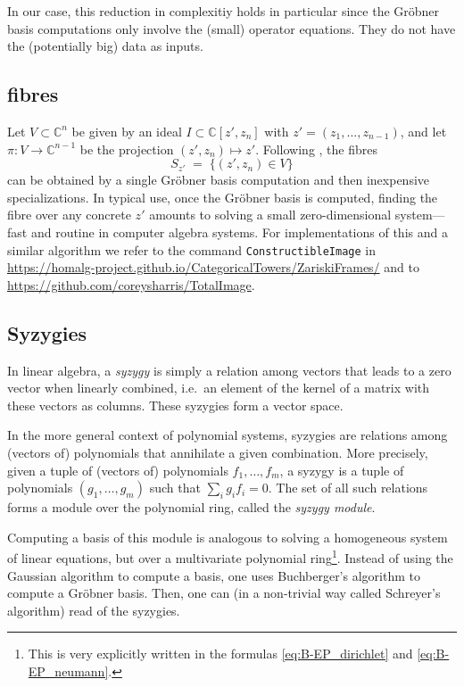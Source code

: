 \documentclass{article} %
\theoremstyle{plain}
\theoremstyle{definition}
\theoremstyle{remark}
\newcommand{\CC}{\mathbb{C}}
\begin{document}
In our case, this reduction in complexitiy holds in particular since the Gr\"obner basis computations only involve the (small) operator equations. They do not have  the (potentially big) data as inputs.

\subsection{fibres}


Let \(V \subset \CC^{n}\) be given by an ideal \(I \subset \CC[z',z_n]\) with \(z'=(z_1,\dots,z_{n-1})\), and let \(\pi:V\to\CC^{n-1}\) be the projection \((z',z_n)\mapsto z'\).
Following \citep{barakat2022algorithmic}, the fibres
\[
S_{z'} \;=\; \{(z',z_n)\in V\}
\]
can be obtained by a single Gröbner basis computation and then inexpensive specializations. In typical use, once the Gröbner basis is computed, finding the fibre over any concrete \(z'\) amounts to solving a small zero-dimensional system—fast and routine in computer algebra systems.
For implementations of this and a similar algorithm we refer to the command \texttt{ConstructibleImage} in \url{https://homalg-project.github.io/CategoricalTowers/ZariskiFrames/} and to \url{https://github.com/coreysharris/TotalImage}.

\subsection{Syzygies}

In linear algebra, a \emph{syzygy} is simply a relation among vectors that leads to a zero vector when linearly combined, i.e.\ an element of the kernel of a matrix with these vectors as columns. These syzygies form a vector space.

In the more general context of polynomial systems, syzygies are relations among (vectors of) polynomials that annihilate a given combination. More precisely, given a tuple of (vectors of) polynomials $f_1, \ldots, f_m$, a syzygy is a tuple of polynomials $(g_1, \ldots, g_m)$ such that $\sum_i g_i f_i = 0$.
The set of all such relations forms a module over the polynomial ring, called the \emph{syzygy module}.

Computing a basis of this module is analogous to solving a homogeneous system of linear equations, but over a multivariate polynomial ring\footnote{This is very explicitly written in the formulas \eqref{eq:B-EP_dirichlet} and \eqref{eq:B-EP_neumann}.}. Instead of using the Gaussian algorithm to compute a basis, one uses Buchberger's algorithm to compute a Gröbner basis. Then, one can (in a non-trivial way called Schreyer’s algorithm) read of the syzygies.
\end{document}
